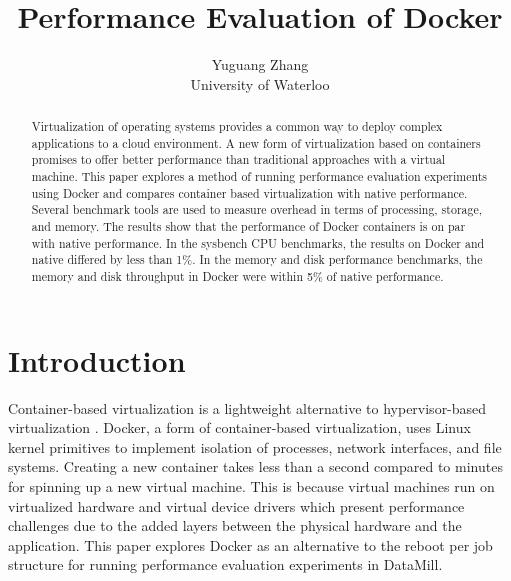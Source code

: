 \documentclass[11pt]{article}
\begin{document}
	
	\thispagestyle{empty}
	
	\title{Performance Evaluation of Docker}
	
	\author{Yuguang Zhang \\ University of Waterloo}
	
	\maketitle
	

\begin{abstract}
Virtualization of operating systems provides a common way to deploy complex
applications to a cloud environment. A new form of virtualization based on containers
promises to offer better performance than traditional approaches with a virtual machine.
This paper explores a method of running performance evaluation experiments using
Docker and compares container based virtualization with native performance. Several
benchmark tools are used to measure overhead in terms of processing, storage,
and memory. The results show that the performance of Docker containers is on par with native performance. In the sysbench CPU benchmarks, the results on Docker and native differed by less than 1\%. In the memory and disk performance benchmarks, the memory and disk throughput in Docker were within 5\% of native performance. 
\end{abstract}

\section{Introduction}
Container-based virtualization is a lightweight alternative to hypervisor-based virtualization \cite{morabito}. Docker, a form of container-based virtualization, uses Linux kernel primitives to implement isolation of processes, network interfaces, and file systems. Creating a new container takes less than a second compared to minutes for spinning up a new virtual machine. This is because virtual machines run on virtualized hardware and virtual device drivers which present performance challenges due to the added layers between the physical hardware and the application. This paper explores Docker as an alternative to the reboot per job structure for running performance evaluation experiments in DataMill. 
\end{document}
